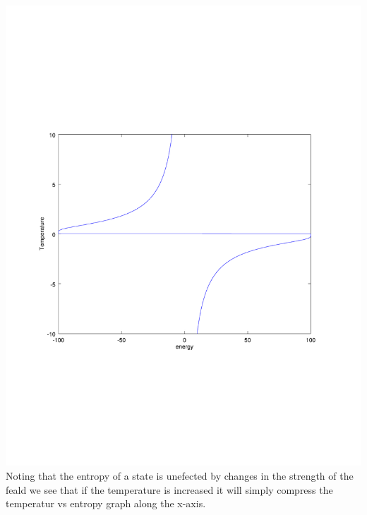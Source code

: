 \documentclass[12pt]{article}
\makeatletter
\theoremstyle{homework}
\newenvironment{exercise}[1]
{\def\@currentlabel{#1}\exercisecore}
{\endexercisecore}
\makeatother
\begin{document}
\begin{exercise}{3.22}
\includegraphics[scale=.3]{../octave/f3.pdf}\\
Noting that the entropy of a state is unefected by changes in the strength of the feald we see that if the temperature is increased it will simply compress the temperatur vs entropy graph along the x-axis.
\end{exercise}
\end{document}
